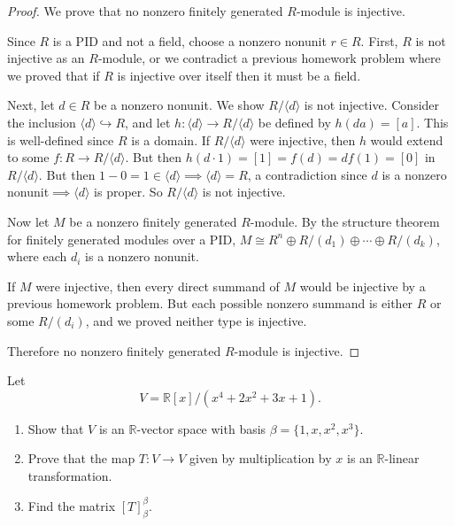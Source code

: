 \documentclass[addpoints,10pt]{exam}
\theoremstyle{plain}
\theoremstyle{definition}
\newtheorem{prob}[thm]{Problem}
\theoremstyle{plain}
\theoremstyle{plain}
\theoremstyle{definition}
\let\oldprob\prob
\let\endoldprob\endprob
\renewenvironment{prob}
  {\begin{singlespace}\oldprob}
  {\endoldprob\end{singlespace}}
\newcommand{\RR}{\ensuremath{\mathbb{R}}}
\begin{document}
\begin{proof}
We prove that no nonzero finitely generated $R$-module is injective.

Since $R$ is a PID and not a field, choose a nonzero nonunit $r\in R$. First, $R$ is not injective as an $R$-module, or we contradict a previous homework problem where we proved that if $R$ is injective over itself then it must be a field.

Next, let $d\in R$ be a nonzero nonunit. We show $R/\langle d\rangle
$ is not injective. Consider the inclusion $\langle d\rangle\hookrightarrow R$, and let
$h:\langle d\rangle\to R/\langle d\rangle$ be defined by $h(da)=[a]$. This is well-defined since $R$ is a
domain. If $R/\langle d\rangle$ were injective, then $h$ would extend to some
$f:R\to R/\langle d\rangle$. But then
$h(d\cdot 1)=[1]=f(d)=df(1)=[0]$ in $R/\langle d\rangle$. But then $1-0=1\in \langle d\rangle\implies \langle d\rangle=R$, a contradiction since $d$ is a nonzero nonunit$ \implies \langle d\rangle$ is proper. So $R/\langle d\rangle$ is not
injective.

Now let $M$ be a nonzero finitely generated $R$-module. By the structure
theorem for finitely generated modules over a PID,
$M\cong R^n\oplus R/(d_1)\oplus\cdots\oplus R/(d_k)$,
where each $d_i$ is a nonzero nonunit.

If $M$ were injective, then every direct summand of $M$ would be
injective by a previous homework problem. But each possible nonzero summand is either $R$
or some $R/(d_i)$, and we proved neither type is injective.

Therefore no nonzero finitely generated $R$-module is injective.

\end{proof}


\newpage

\begin{prob}
Let
\[
V=\RR[x]/(x^4+2x^2+3x+1).
\]

\begin{enumerate}[label=(\alph*)]
\item Show that $V$ is an $\RR$-vector space with basis
$\beta=\{1,x,x^2,x^3\}$.

\item Prove that the map $T:V\to V$ given by multiplication by $x$ is an $\RR$-linear transformation.

\item Find the matrix $[T]_{\beta}^{\beta}$.
\end{enumerate}
\end{prob}
\end{document}
